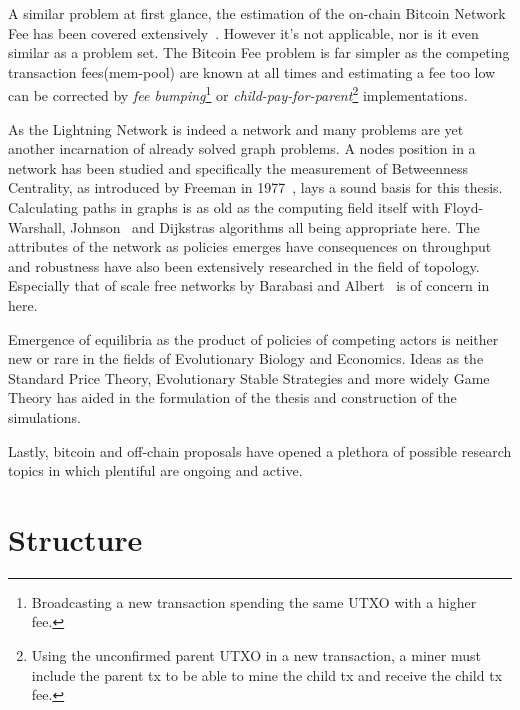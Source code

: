 	A similar problem at first glance, the estimation of the on-chain Bitcoin Network Fee has been covered extensively~\cite{mosterland:transaction:fee, houy:transaction:fee}. However it's not applicable, nor is it even similar as a problem set. The Bitcoin Fee problem is far simpler as the competing transaction fees(mem-pool) are known at all times and estimating a fee too low can be corrected by \textit{fee bumping}\footnote{Broadcasting a new transaction spending the same UTXO with a higher fee.} or \textit{child-pay-for-parent}\footnote{Using the unconfirmed parent UTXO in a new transaction, a miner must include the parent tx to be able to mine the child tx and receive the child tx fee.} implementations.
	
	As the Lightning Network is indeed a network and many problems are yet another incarnation of already solved graph problems. A nodes position in a network has been studied and specifically the measurement of Betweenness Centrality, as introduced by Freeman in 1977~\cite{brandes:betweenness:centrality:algorithm}, lays a sound basis for this thesis. Calculating paths in graphs is as old as the computing field itself with Floyd-Warshall, Johnson~\cite{johnson:shortest:path:sparse:network} and Dijkstras algorithms all being appropriate here. The attributes of the network as policies emerges have consequences on throughput and robustness have also been extensively researched in the field of topology. Especially that of scale free networks by Barabasi and Albert~\cite{barabasi:albert:emergent:scaling} is of concern in here.
	
	Emergence of equilibria as the product of policies of competing actors is neither new or rare in the fields of Evolutionary Biology and Economics. Ideas as the Standard Price Theory, Evolutionary Stable Strategies and more widely Game Theory has aided in the formulation of the thesis and construction of the simulations.
	
	Lastly, bitcoin and off-chain proposals have opened a plethora of possible research topics in which plentiful are ongoing and active.  
	
	
\section{Structure}


